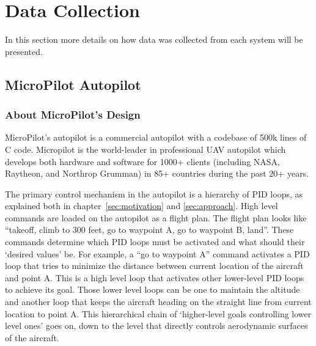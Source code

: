 
\section{Data Collection}
In this section more details on how data was collected from each system will be presented. 


\subsection{MicroPilot Autopilot}
\subsubsection{About MicroPilot's Design}
MicroPilot's autopilot is a commercial autopilot with a codebase of 500k lines of C code. Micropilot is the world-leader in professional UAV autopilot which develops both hardware and software for 1000+ clients (including NASA, Raytheon, and Northrop Grumman) in 85+ countries during the past 20+ years.

The primary control mechanism in the autopilot is a hierarchy of PID loops, as explained both in chapter~\ref{sec:motivation} and \ref{sec:approach}. 
High level commands are loaded on the autopilot as a flight plan. The flight plan looks like ``takeoff, climb to 300 feet, go to waypoint A, go to waypoint B, land''. 
These commands determine which PID loops must be activated and what should their `desired values' be. 
For example, a ``go to waypoint A'' command activates a PID loop that tries to minimize the distance between current location of the aircraft and point A. This is a high level loop that activates other lower-level PID loops to achieve its goal.
Those lower level loops can be one to maintain the altitude and another loop that keeps the aircraft heading on the straight line from current location to point A.
This hierarchical chain of `higher-level goals controlling lower level ones' goes on, down to the level that directly controls aerodynamic surfaces of the aircraft.




